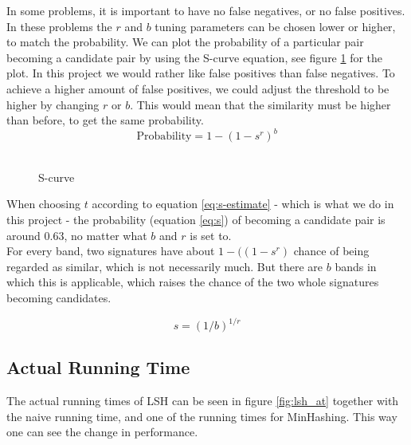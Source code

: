 \documentclass[a4paper,11pt]{article}
\begin{document}
In some problems, it is important to have no false negatives, or no false positives. In these problems the $r$ and $b$ tuning parameters can be chosen lower or higher, to match the probability. We can plot the probability of a particular pair becoming a candidate pair by using the S-curve equation, see figure \ref{fig:scurve} for the plot. In this project we would rather like false positives than false negatives. To achieve a higher amount of false positives, we could adjust the threshold to be higher by changing $r$ or $b$. This would mean that the similarity must be higher than before, to get the same probability. \\

\begin{equation}
    \text {Probability} = 1 - (1 - s^r)^b 
    \label{eq:s}
\end{equation}\\

\begin{figure}[H]
    \begin{center}
        
        \caption{S-curve}
        \label{fig:scurve}
    \end{center}
\end{figure}

When choosing $t$ according to equation \ref{eq:s-estimate} - which is what we do in this project - the probability (equation \ref{eq:s}) of becoming a candidate pair is around $0.63$, no matter what $b$ and $r$ is set to. \\

For every band, two signatures have about $1 - (\left(1-s^r \right)$ chance of being regarded as similar, which is not necessarily much. But there are $b$ bands in which this is applicable, which raises the chance of the two whole signatures becoming candidates.

\begin{equation}
    s = (1/b)^{1/r}
    \label{eq:s-estimate}
\end{equation}


\subsection{Actual Running Time}
The actual running times of LSH can be seen in figure \ref{fig:lsh_at} together with the naive running time, and one of the running times for MinHashing. This way one can see the change in performance.

\end{document}
